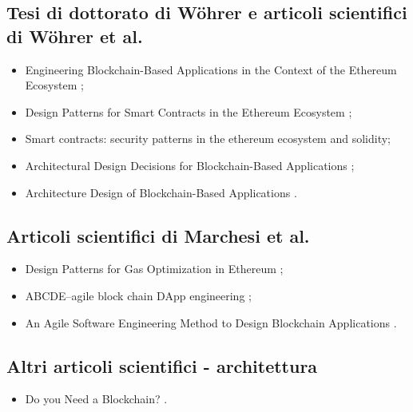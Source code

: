 \subsection*{Tesi di dottorato di Wöhrer e articoli scientifici di Wöhrer et al.}
\begin{itemize}

\item Engineering Blockchain-Based Applications in the Context of the Ethereum Ecosystem \cite{wohrer2022thesis};

\item Design Patterns for Smart Contracts in the Ethereum Ecosystem \cite{wohrer2018designpatterns};

\item Smart contracts: security patterns in the ethereum ecosystem and solidity\cite{wohrer2018securitypatterns};

\item Architectural Design Decisions for Blockchain-Based Applications \cite{wohrer2021decisions};

\item Architecture Design of Blockchain-Based Applications \cite{wohrer2021architecture}.

\end{itemize}

\subsection*{Articoli scientifici di Marchesi et al.}
\begin{itemize}

\item Design Patterns for Gas Optimization in Ethereum \cite{marchesi2020gas};

\item ABCDE--agile block chain DApp engineering \cite{marchesi2020agile};

\item An Agile Software Engineering Method to Design Blockchain Applications \cite{marchesi2018agile}.

\end{itemize}

\subsection*{Altri articoli scientifici - architettura}
\begin{itemize}

\item Do you Need a Blockchain? \cite{wurst2018blockchain}.

\end{itemize}

